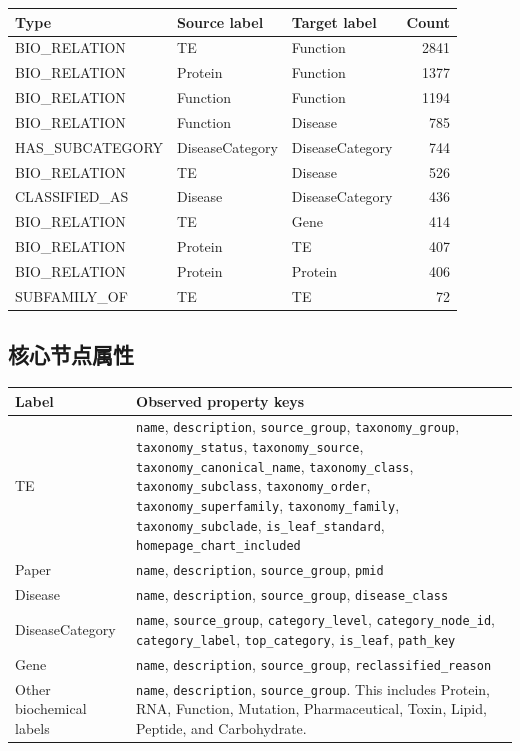 \documentclass[UTF8]{ctexart}
\begin{document}
\begin{longtable}{lllr}
\toprule
Type & Source label & Target label & Count \\
\midrule
\endhead
BIO\_RELATION & TE & Function & 2841 \\
BIO\_RELATION & Protein & Function & 1377 \\
BIO\_RELATION & Function & Function & 1194 \\
BIO\_RELATION & Function & Disease & 785 \\
HAS\_SUBCATEGORY & DiseaseCategory & DiseaseCategory & 744 \\
BIO\_RELATION & TE & Disease & 526 \\
CLASSIFIED\_AS & Disease & DiseaseCategory & 436 \\
BIO\_RELATION & TE & Gene & 414 \\
BIO\_RELATION & Protein & TE & 407 \\
BIO\_RELATION & Protein & Protein & 406 \\
SUBFAMILY\_OF & TE & TE & 72 \\
\bottomrule
\end{longtable}

\subsection{核心节点属性}

\begin{longtable}{L{3.4cm}L{10.8cm}}
\toprule
Label & Observed property keys \\
\midrule
\endhead
TE & \texttt{name}, \texttt{description}, \texttt{source\_group}, \texttt{taxonomy\_group}, \texttt{taxonomy\_status}, \texttt{taxonomy\_source}, \texttt{taxonomy\_canonical\_name}, \texttt{taxonomy\_class}, \texttt{taxonomy\_subclass}, \texttt{taxonomy\_order}, \texttt{taxonomy\_superfamily}, \texttt{taxonomy\_family}, \texttt{taxonomy\_subclade}, \texttt{is\_leaf\_standard}, \texttt{homepage\_chart\_included} \\
Paper & \texttt{name}, \texttt{description}, \texttt{source\_group}, \texttt{pmid} \\
Disease & \texttt{name}, \texttt{description}, \texttt{source\_group}, \texttt{disease\_class} \\
DiseaseCategory & \texttt{name}, \texttt{source\_group}, \texttt{category\_level}, \texttt{category\_node\_id}, \texttt{category\_label}, \texttt{top\_category}, \texttt{is\_leaf}, \texttt{path\_key} \\
Gene & \texttt{name}, \texttt{description}, \texttt{source\_group}, \texttt{reclassified\_reason} \\
Other biochemical labels & \texttt{name}, \texttt{description}, \texttt{source\_group}. This includes Protein, RNA, Function, Mutation, Pharmaceutical, Toxin, Lipid, Peptide, and Carbohydrate. \\
\bottomrule
\end{longtable}
\end{document}
